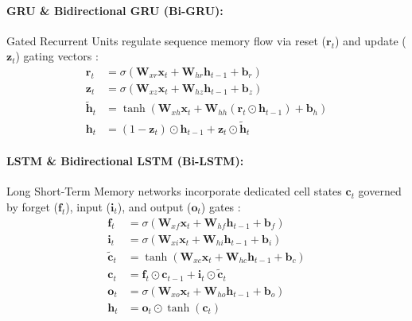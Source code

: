 \documentclass[11pt,a4paper]{article}
\begin{document}
\paragraph{GRU & Bidirectional GRU (Bi-GRU):}
Gated Recurrent Units regulate sequence memory flow via reset ($\mathbf{r}_t$) and update ($\mathbf{z}_t$) gating vectors \cite{cho2014gru}:
\begin{align}
\mathbf{r}_t &= \sigma(\mathbf{W}_{xr} \mathbf{x}_t + \mathbf{W}_{hr} \mathbf{h}_{t-1} + \mathbf{b}_r) \\
\mathbf{z}_t &= \sigma(\mathbf{W}_{xz} \mathbf{x}_t + \mathbf{W}_{hz} \mathbf{h}_{t-1} + \mathbf{b}_z) \\
\tilde{\mathbf{h}}_t &= \tanh(\mathbf{W}_{xh} \mathbf{x}_t + \mathbf{W}_{hh} (\mathbf{r}_t \odot \mathbf{h}_{t-1}) + \mathbf{b}_h) \\
\mathbf{h}_t &= (1 - \mathbf{z}_t) \odot \mathbf{h}_{t-1} + \mathbf{z}_t \odot \tilde{\mathbf{h}}_t
\end{align}

\paragraph{LSTM & Bidirectional LSTM (Bi-LSTM):}
Long Short-Term Memory networks incorporate dedicated cell states $\mathbf{c}_t$ governed by forget ($\mathbf{f}_t$), input ($\mathbf{i}_t$), and output ($\mathbf{o}_t$) gates \cite{hochreiter1997lstm}:
\begin{align}
\mathbf{f}_t &= \sigma(\mathbf{W}_{xf} \mathbf{x}_t + \mathbf{W}_{hf} \mathbf{h}_{t-1} + \mathbf{b}_f) \\
\mathbf{i}_t &= \sigma(\mathbf{W}_{xi} \mathbf{x}_t + \mathbf{W}_{hi} \mathbf{h}_{t-1} + \mathbf{b}_i) \\
\tilde{\mathbf{c}}_t &= \tanh(\mathbf{W}_{xc} \mathbf{x}_t + \mathbf{W}_{hc} \mathbf{h}_{t-1} + \mathbf{b}_c) \\
\mathbf{c}_t &= \mathbf{f}_t \odot \mathbf{c}_{t-1} + \mathbf{i}_t \odot \tilde{\mathbf{c}}_t \\
\mathbf{o}_t &= \sigma(\mathbf{W}_{xo} \mathbf{x}_t + \mathbf{W}_{ho} \mathbf{h}_{t-1} + \mathbf{b}_o) \\
\mathbf{h}_t &= \mathbf{o}_t \odot \tanh(\mathbf{c}_t)
\end{align}
\end{document}
